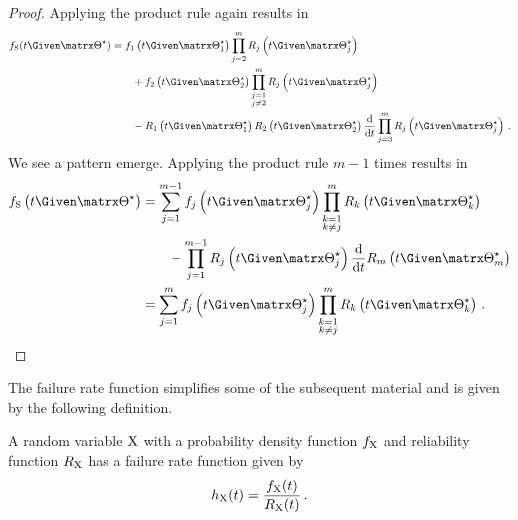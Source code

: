 \documentclass[../main.tex]{subfiles}
\begin{document}
\begin{proof}
Applying the product rule again results in
\begin{equation}
\begin{split}
    \spdf(t \Given \tparam\sysparam) &= \pdf_1\left(t \Given \tparam{\sysparam}_1\right) \prod_{\substack{j=2}}^{m} \srv_j\left(t \Given \tparam{\sysparam}_j\right)\\
    & \qquad + \pdf_2\left(t \Given \tparam{\sysparam}_2\right) \prod_{\substack{j=1\\j \neq 2}}^{m} \srv_j\left(t \Given \tparam{\sysparam}_j\right)\\
    & \qquad - \srv_1\left(t \Given \tparam{\sysparam}_1\right) \srv_2\left(t \Given \tparam{\sysparam}_2\right) \derivative{t} \prod_{j=3}^{m} \srv_j\left(t \Given \tparam{\sysparam}_j\right)\,.
\end{split}
\end{equation}
We see a pattern emerge. Applying the product rule $m-1$ times results in
\begin{align}
\begin{split}
    \spdf\left(t \Given \tparam\sysparam\right)
        &= \sum_{j=1}^{m-1} \pdf_j\left(t \Given \tparam{\sysparam}_j\right) \prod_{\substack{k=1\\k \neq j}}^{m} \srv_k\left(t \Given \tparam{\sysparam}_k \right)\\
        & \qquad - \prod_{j=1}^{m-1} \srv_j\left(t \Given \tparam{\sysparam}_j\right) \derivative{t} \srv_m\left(t \Given \tparam{\sysparam}_m\right)\\
        &= \sum_{j=1}^{m} \pdf_j\left(t \Given \tparam{\sysparam}_j\right) \prod_{\substack{k=1\\k \neq j}}^{m} \srv_k\left(t \Given \tparam{\sysparam}_k\right)\,.
\end{split}
\end{align}
\end{proof}

The failure rate function simplifies some of the subsequent material and is given by the following definition.
\begin{definition}
\label{def:failure_rate}
A random variable $\mathrm{X}$ with a probability density function $f_{\mathrm{X}}$ 
and reliability function $R_{\mathrm{X}}$ has a failure rate function given by
\begin{equation}
\label{eq:def_failure_rate}
    h_{\mathrm{X}}(t) = \frac{f_{\mathrm{X}}(t)}{R_{\mathrm{X}}(t)}\,.
\end{equation}
\end{definition}
\end{document}
